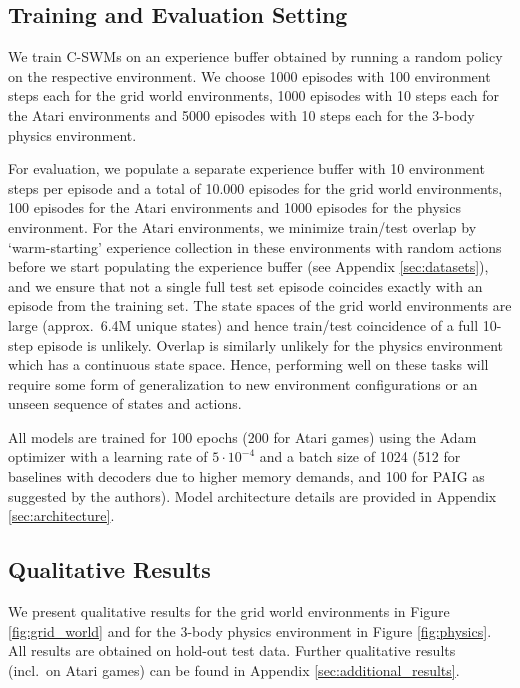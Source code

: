 \documentclass{article} %
\begin{document}
\subsection{Training and Evaluation Setting}
We train C-SWMs on an experience buffer obtained by running a random policy on the respective environment. We choose 1000 episodes with 100 environment steps each for the grid world environments, 1000 episodes with 10 steps each for the Atari environments and 5000 episodes with 10 steps each for the 3-body physics environment.

For evaluation, we populate a separate experience buffer with 10 environment steps per episode and a total of 10.000 episodes for the grid world environments, 100 episodes for the Atari environments and 1000 episodes for the physics environment. For the Atari environments, we minimize train/test overlap by `warm-starting' experience collection in these environments with random actions before we start populating the experience buffer (see Appendix \ref{sec:datasets}), and we ensure that not a single full test set episode coincides exactly with an episode from the training set. The state spaces of the grid world environments are large (approx.~6.4M unique states) and hence train/test coincidence of a full 10-step episode is unlikely. Overlap is similarly unlikely for the physics environment which has a continuous state space. Hence, performing well on these tasks will require some form of generalization to new environment configurations or an unseen sequence of states and actions.

All models are trained for 100 epochs (200 for Atari games) using the Adam \citep{kingma2014adam} optimizer with a learning rate of $5\cdot 10^{-4}$ and a batch size of 1024 (512 for baselines with decoders due to higher memory demands, and 100 for PAIG as suggested by the authors). Model architecture details are provided in Appendix \ref{sec:architecture}.

\subsection{Qualitative Results}

We present qualitative results for the grid world environments in Figure \ref{fig:grid_world} and for the 3-body physics environment in Figure \ref{fig:physics}. All results are obtained on hold-out test data. Further qualitative results (incl.~on Atari games) can be found in Appendix \ref{sec:additional_results}.
\end{document}
